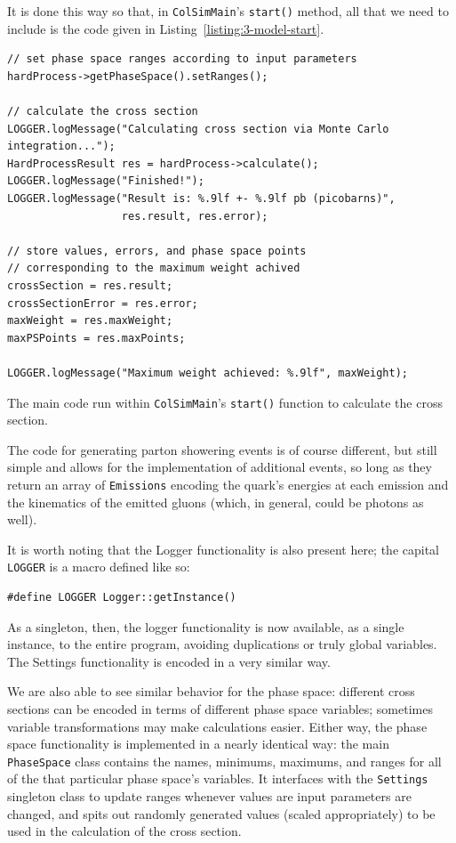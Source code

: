 It is done this way so that, in \texttt{ColSimMain}'s \texttt{start()} method, all that we need to include is the code given in Listing~\ref{listing:3-model-start}.

\begin{listing}[ht]
\begin{verbatim}
// set phase space ranges according to input parameters
hardProcess->getPhaseSpace().setRanges();

// calculate the cross section
LOGGER.logMessage("Calculating cross section via Monte Carlo integration...");
HardProcessResult res = hardProcess->calculate();
LOGGER.logMessage("Finished!");
LOGGER.logMessage("Result is: %.9lf +- %.9lf pb (picobarns)",
				  res.result, res.error);

// store values, errors, and phase space points
// corresponding to the maximum weight achived
crossSection = res.result;
crossSectionError = res.error;
maxWeight = res.maxWeight;
maxPSPoints = res.maxPoints;

LOGGER.logMessage("Maximum weight achieved: %.9lf", maxWeight);
\end{verbatim}
\caption{The main code run within \texttt{ColSimMain}'s \texttt{start()} function to calculate the cross section.}
\label{listing:3-model-start}
\end{listing}

The code for generating parton showering events is of course different, but still simple and allows for the implementation of additional events, so long as they return an array of \texttt{Emissions} encoding the quark's energies at each emission and the kinematics of the emitted gluons (which, in general, could be photons as well).

It is worth noting that the Logger functionality is also present here; the capital \texttt{LOGGER} is a macro defined like so:

\begin{verbatim}
#define LOGGER Logger::getInstance()
\end{verbatim}

As a singleton, then, the logger functionality is now available, as a single instance, to the entire program, avoiding duplications or truly global variables. The Settings functionality is encoded in a very similar way.

We are also able to see similar behavior for the phase space: different cross sections can be encoded in terms of different phase space variables; sometimes variable transformations may make calculations easier. Either way, the phase space functionality is implemented in a nearly identical way: the main \texttt{PhaseSpace} class contains the names, minimums, maximums, and ranges for all of the that particular phase space's variables. It interfaces with the \texttt{Settings} singleton class to update ranges whenever values are input parameters are changed, and spits out randomly generated values (scaled appropriately) to be used in the calculation of the cross section.


